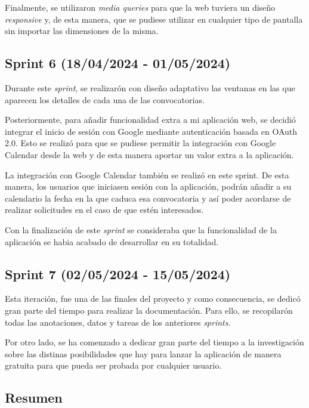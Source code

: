 Finalmente, se utilizaron \textit{media queries} para que la web tuviera un diseño \textit{responsive}  y, de esta manera, que se pudiese utilizar en cualquier tipo de pantalla sin importar las dimensiones de la misma.


\subsection{Sprint 6 (18/04/2024 -
01/05/2024)}

Durante este \textit{sprint}, se realizarón con diseño adaptativo las ventanas en las que aparecen los detalles de cada una de las convocatorias.

Posteriormente, para añadir funcionalidad extra a mi aplicación web, se decidió integrar el inicio de sesión con Google mediante autenticación basada en OAuth 2.0. Esto se realizó para que se pudiese permitir la integración con Google Calendar desde la web y de esta manera aportar un valor extra a la aplicación.

La integración con Google Calendar también se realizó en este sprint. De esta manera, los usuarios que iniciasen sesión con la aplicación, podrán añadir a su calendario la fecha en la que caduca esa convocatoria y así poder acordarse de realizar solicitudes en el caso de que estén interesados.

Con la finalización de este \textit{sprint} se consideraba que la funcionalidad de la aplicación se habia acabado de desarrollar en su totalidad.


\subsection{Sprint 7 (02/05/2024 -
15/05/2024)}
Esta iteración, fue una de las finales del proyecto y como consecuencia, se dedicó gran parte del tiempo para realizar la documentación. Para ello, se recopilarón todas las anotaciones, datos y tareas de los anteriores \textit{sprints}. 

Por otro lado, se ha comenzado a dedicar gran parte del tiempo a la investigación sobre las distinas posibilidades que hay para lanzar la aplicación de manera gratuita para que pueda ser probada por cualquier usuario.

\subsection{Resumen}

